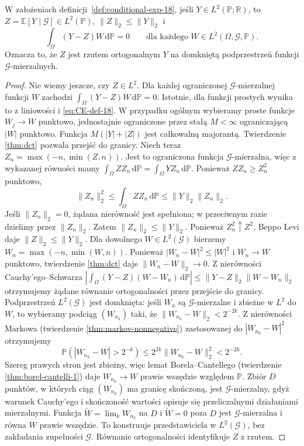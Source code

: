 \begin{twierdzenie}
\label{thm:CE-orthogonal-18}
W założeniach definicji~\ref{def:conditional-exp-18},
jeśli $Y\in L^2(\mathbb P;\mathbb R)$, to
$Z=\mathbb E[Y\mid\mathcal G]\in L^2(\mathbb P)$,
$\|Z\|_2\le\|Y\|_2$ i
\[
\int_\Omega(Y-Z)W\,\mathrm d\mathbb P=0
\qquad\text{dla każdego }W\in L^2(\Omega,\mathcal G,\mathbb P).
\]
Oznacza to, że $Z$ jest rzutem ortogonalnym $Y$
na domkniętą podprzestrzeń funkcji $\mathcal G$-mierzalnych.
\end{twierdzenie}
\begin{proof}
Nie wiemy jeszcze, czy $Z\in L^2$.
Dla każdej ograniczonej $\mathcal G$-mierzalnej funkcji $W$
zachodzi $\int_\Omega(Y-Z)W\,\mathrm d\mathbb P=0$.
Istotnie, dla funkcji prostych wynika to z liniowości
i \eqref{eq:CE-def-18}. W przypadku ogólnym wybieramy
proste funkcje $W_j\to W$ punktowo, jednostajnie ograniczone
przez stałą $M<\infty$ ograniczającą $|W|$ punktowo.
Funkcja $M(|Y|+|Z|)$ jest całkowalną majorantą. Twierdzenie \ref{thm:dct} pozwala przejść do granicy.
Niech teraz $Z_n=\max(-n,\min(Z,n))$. Jest to ograniczona
funkcja $\mathcal G$-mierzalna, więc z wykazanej równości mamy
$\int_\Omega ZZ_n\,\mathrm d\mathbb P
=\int_\Omega YZ_n\,\mathrm d\mathbb P$.
Ponieważ $ZZ_n\ge Z_n^2$ punktowo,
\[
\|Z_n\|_2^2\le\int_\Omega ZZ_n\,\mathrm d\mathbb P
\le\|Y\|_2\|Z_n\|_2.
\]
Jeśli $\|Z_n\|_2=0$, żądana nierówność jest spełniona;
w przeciwnym razie dzielimy przez $\|Z_n\|_2$.
Zatem $\|Z_n\|_2\le\|Y\|_2$.
Ponieważ $Z_n^2\uparrow Z^2$, Beppo Levi daje
$\|Z\|_2\le\|Y\|_2$. Dla dowolnego $W\in L^2(\mathcal G)$
bierzemy $W_n=\max(-n,\min(W,n))$. Ponieważ
$|W_n-W|^2\le |W|^2$ i $W_n\to W$ punktowo,
twierdzenie \ref{thm:dct} daje $\|W_n-W\|_2\to0$.
Z nierówności Cauchy'ego--Schwarza
$|\int_\Omega(Y-Z)(W-W_n)\,\mathrm d\mathbb P|\le
\|Y-Z\|_2\|W-W_n\|_2$ otrzymujemy żądane równanie
ortogonalności przez przejście do granicy.
Podprzestrzeń $L^2(\mathcal G)$ jest domknięta:
jeśli $W_n$ są $\mathcal G$-mierzalne i zbieżne w $L^2$
do $W$, to wybieramy podciąg $(W_{n_k})$ taki, że
$\|W_{n_k}-W\|_2<2^{-2k}$. Z nierówności Markowa (twierdzenie \ref{thm:markov-nonnegative})
zastosowanej do $|W_{n_k}-W|^2$ otrzymujemy
\[
 \mathbb P(|W_{n_k}-W|>2^{-k})\le
 2^{2k}\|W_{n_k}-W\|_2^2<2^{-2k}.
\]
Szereg prawych stron jest zbieżny, więc lemat
Borela--Cantellego (twierdzenie \ref{thm:borel-cantelli-1})
daje $W_{n_k}\to W$ prawie wszędzie względem $\mathbb P$.
Zbiór $D$ punktów, w których ciąg $(W_{n_k})$
ma granicę skończoną, jest $\mathcal G$-mierzalny,
gdyż warunek Cauchy'ego i skończoność wartości
opisuje się przeliczalnymi działaniami mierzalnymi.
Funkcja $\widetilde W=\lim_kW_{n_k}$ na $D$
i $\widetilde W=0$ poza $D$ jest
$\mathcal G$-mierzalna i równa $W$ prawie wszędzie.
To konstruuje przedstawiciela w $L^2(\mathcal G)$,
bez zakładania zupełności $\mathcal G$.
Równanie ortogonalności identyfikuje $Z$ z rzutem.
\end{proof}

